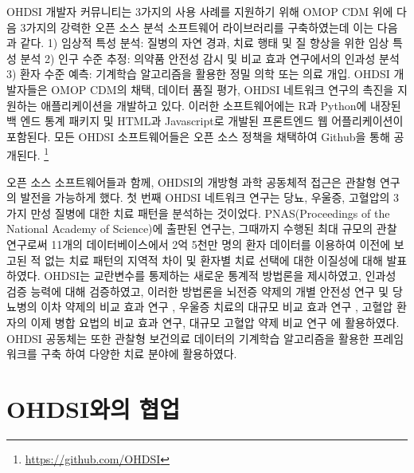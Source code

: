 \documentclass[10.5pt]{book}
\let\rmarkdownfootnote\footnote%
\def\footnote{\protect\rmarkdownfootnote}
\theoremstyle{definition}
\theoremstyle{definition}
\theoremstyle{definition}
\theoremstyle{remark}
\begin{document}
OHDSI 개발자 커뮤니티는 3가지의 사용 사례를 지원하기 위해 OMOP CDM 위에
다음 3가지의 강력한 오픈 소스 분석 소프트웨어 라이브러리를 구축하였는데
이는 다음과 같다. 1) 임상적 특성 분석: 질병의 자연 경과, 치료 행태 및 질
향상을 위한 임상 특성 분석 2) 인구 수준 추정: 의약품 안전성 감시 및 비교
효과 연구에서의 인과성 분석 3) 환자 수준 예측: 기계학습 알고리즘을
활용한 정밀 의학 또는 의료 개입. OHDSI 개발자들은 OMOP CDM의 채택,
데이터 품질 평가, OHDSI 네트워크 연구의 촉진을 지원하는 애플리케이션을
개발하고 있다. 이러한 소프트웨어에는 R과 Python에 내장된 백 엔드 통계
패키지 및 HTML과 Javascript로 개발된 프론트엔드 웹 어플리케이션이
포함된다. 모든 OHDSI 소프트웨어들은 오픈 소스 정책을 채택하여 Github을
통해 공개된다. \footnote{\url{https://github.com/OHDSI}}

오픈 소스 소프트웨어들과 함께, OHDSI의 개방형 과학 공동체적 접근은
관찰형 연구의 발전을 가능하게 했다. 첫 번째 OHDSI 네트워크 연구는 당뇨,
우울증, 고혈압의 3가지 만성 질병에 대한 치료 패턴을 분석하는 것이었다.
PNAS(Proceedings of the National Academy of Science)에 출판된 연구는,
그때까지 수행된 최대 규모의 관찰 연구로써 11개의 데이터베이스에서 2억
5천만 명의 환자 데이터를 이용하여 이전에 보고된 적 없는 치료 패턴의
지역적 차이 및 환자별 치료 선택에 대한 이질성에 대해 발표하였다.
\citep{Hripcsak7329} OHDSI는 교란변수를 통제하는 새로운 통계적 방법론을
제시하였고, \citep{tian_2018} 인과성 검증 능력에 대해 검증하였고,
\citep{schuemie_2018} 이러한 방법론을 뇌전증 약제의 개별 안전성 연구
\citep{duke_2017} 및 당뇨병의 이차 약제의 비교 효과 연구
\citep{vashisht_2018}, 우울증 치료의 대규모 비교 효과 연구
\citep{schuemie_2018b}, 고혈압 환자의 이제 병합 요법의 비교 효과
연구\citep{you_olmesartan_2019}, 대규모 고혈압 약제 비교
연구\citep{suchard_comprehensive_2019} 에 활용하였다. OHDSI 공동체는
또한 관찰형 보건의료 데이터의 기계학습 알고리즘을 활용한 프레임 워크를
구축 \citep{reps2018} 하여 다양한 치료 분야에 활용하였다.
\citep{johnston_2019, cepeda_2018, reps_2019}

\hypertarget{ohdsi-}{\section{OHDSI와의 협업}\label{ohdsi-}}
\end{document}
